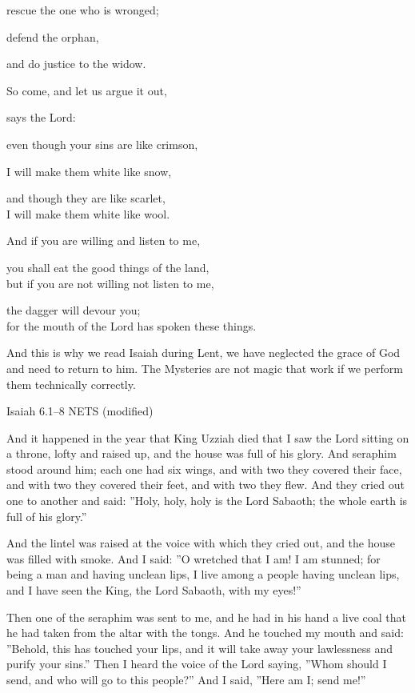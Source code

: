 \documentclass[
]{article}
\newcommand{\RL}[1]{\beginR #1\endR}
\begin{document}
rescue the one who is wronged;

defend the orphan,

and do justice to the widow.

So come, and let us argue it out,

says the Lord:

even though your sins are like crimson,

I will make them white like snow,

and though they are like scarlet,\\
I will make them white like wool.

And if you are willing and listen to me,

you shall eat the good things of the land,\\
but if you are not willing not listen to me,

the dagger will devour you;\\
for the mouth of the Lord has spoken these things.

And this is why we read Isaiah during Lent, we have neglected the grace
of God and need to return to him. The Mysteries are not magic that work
if we perform them technically correctly.

Isaiah 6.1--8 NETS (modified)

And it happened in the year that King Uzziah died that I saw the Lord
sitting on a throne, lofty and raised up, and the house was full of his
glory. And seraphim stood around him; each one had six wings, and with
two they covered their face, and with two they covered their feet, and
with two they flew. And they cried out one to another and
said:\RL{\hfill\break
''}Holy, holy, holy is the Lord Sabaoth; the whole earth is full of his
glory.''

And the lintel was raised at the voice with which they cried out, and
the house was filled with smoke. And I said: \RL{''}O wretched that I
am! I am stunned; for being a man and having unclean lips, I live among
a people having unclean lips, and I have seen the King, the Lord
Sabaoth, with my eyes!''

Then one of the seraphim was sent to me, and he had in his hand a live
coal that he had taken from the altar with the tongs. And he touched my
mouth and said: \RL{''}Behold, this has touched your lips, and it will
take away your lawlessness and purify your sins.'' Then I heard the
voice of the Lord saying, \RL{''}Whom should I send, and who will go to
this people?'' And I said, \RL{''}Here am I; send me!''
\end{document}
